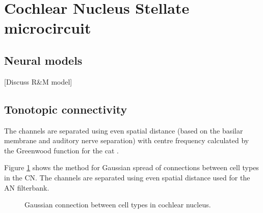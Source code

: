 \section{Cochlear Nucleus Stellate microcircuit}

\subsection{Neural models}
[Discuss R\&M model]

\medskip{}

\subsection{Tonotopic connectivity}

The channels are separated using even spatial distance (based on the
basilar membrane and auditory nerve separation) with centre frequency
calculated by the Greenwood function for the cat
\citep{Greenwood:1990}.

Figure \ref{fig:CNconn} shows the method for Gaussian spread of
connections between cell types in the CN.  The channels are separated
using even spatial distance used for the AN filterbank.


\begin{figure}[tbh]
  \begin{center}
    \caption{Gaussian connection between cell types in cochlear
      nucleus. }
    \label{fig:CNconn}
  \end{center}
\end{figure}






